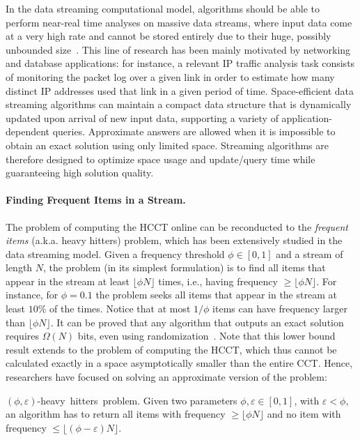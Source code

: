 In the data streaming computational model, algorithms should be able to perform near-real time analyses on massive data streams, where input data come at a very high rate and cannot be stored entirely due to their huge, possibly unbounded size~\cite{Demetrescu07,Muthukrishnan05}. This line of research has been mainly motivated by networking and database applications: for instance, a relevant IP traffic analysis task consists of monitoring the packet log over a given link in order to estimate how many distinct IP addresses used that link in a given period of time. Space-efficient data streaming algorithms can maintain a compact data structure that is dynamically updated upon arrival of new input data, supporting a variety of application-dependent queries. Approximate answers are allowed when it is impossible to obtain an exact solution using only limited space. Streaming algorithms are therefore designed to optimize space usage and update/query time while guaranteeing high solution quality.

\paragraph*{Finding Frequent Items in a Stream.} The problem of computing the HCCT online can be reconducted to the {\em frequent items} (a.k.a. heavy hitters) problem, which has been extensively studied in the data streaming model. Given a frequency threshold $\phi\in[0,1]$ and a stream of length $N$, the problem (in its simplest formulation) is to find all items that appear in the stream at least $\lfloor\phi N\rfloor$ times, i.e., having frequency $\ge\lfloor\phi N\rfloor$. For instance, for $\phi=0.1$ the problem seeks all items that appear in the stream at least $10\%$ of the times. Notice that at most $1/\phi$ items can have frequency larger than $\lfloor\phi N\rfloor$.  It can be proved that any algorithm that outputs an exact solution requires $\Omega(N)$ bits, even using randomization~\cite{Muthukrishnan05}. Note that this lower bound result extends to the problem of computing the HCCT, which thus cannot be calculated exactly in a space asymptotically smaller than the entire CCT. Hence, researchers have focused on solving an approximate version of the problem:

\begin{definition} 
{\mbox{$(\phi,\varepsilon)$-heavy hitters problem.}} Given two parameters $\phi,\varepsilon\in[0,1]$, with $\varepsilon<\phi$, an algorithm has to return all items with frequency $\ge\lfloor\phi N\rfloor$ and no item with frequency $\le\lfloor(\phi-\varepsilon) N\rfloor$.
\end{definition} 

